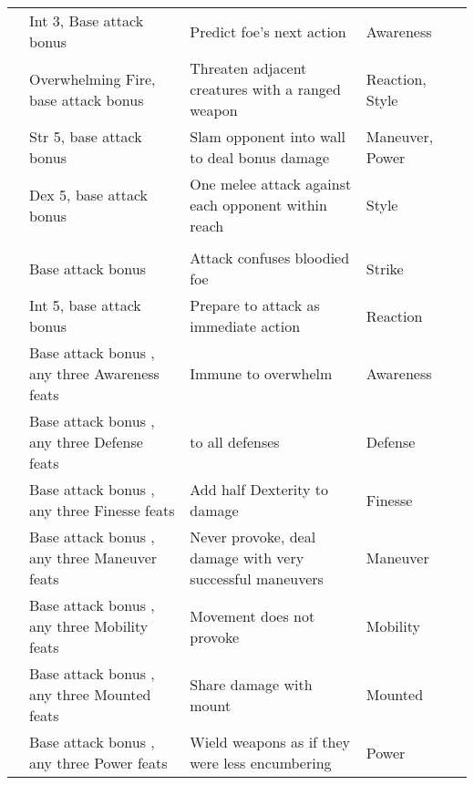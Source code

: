 {\begin{longtabu}{>{\lcol}p{10em} >{\lcol}p{15em} >{\lcol}X >{\lcol}p{6em} >{\lcol}p{3em}}
 & Int 3, Base attack bonus  & Predict foe's next action & Awareness &  \\
 & Overwhelming Fire, base attack bonus  & Threaten adjacent creatures with a ranged weapon & Reaction, Style &  \\
 & Str 5, base attack bonus  & Slam opponent into wall to deal bonus damage & Maneuver, Power &  \\
 & Dex 5, base attack bonus  & One melee attack against each opponent within reach & Style &  \\

\midrule
{} &  &  &  &  \\
 & Base attack bonus  & Attack confuses bloodied foe & Strike &  \\
 & Int 5, base attack bonus  & Prepare to attack as immediate action & Reaction &  \\
 & Base attack bonus , any three Awareness feats & Immune to overwhelm & Awareness &  \\
 & Base attack bonus , any three Defense feats &  to all defenses & Defense &  \\
 & Base attack bonus , any three Finesse feats & Add half Dexterity to damage & Finesse &  \\
 & Base attack bonus , any three Maneuver feats & Never provoke, deal damage with very successful maneuvers & Maneuver &  \\
 & Base attack bonus , any three Mobility feats & Movement does not provoke & Mobility&  \\
 & Base attack bonus , any three Mounted feats & Share damage with mount & Mounted&  \\
 & Base attack bonus , any three Power feats & Wield weapons as if they were less encumbering & Power&  \\

\end{longtabu}}
